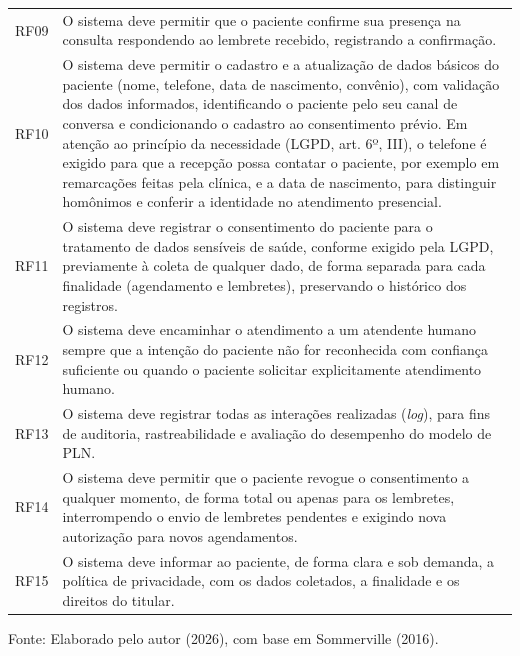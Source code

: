 \documentclass[12pt,a4paper]{extarticle}
\begin{document}
\begin{xltabular}{\textwidth}{p{1.4cm}Y}
RF09 & O sistema deve permitir que o paciente confirme sua presença na consulta respondendo ao lembrete recebido, registrando a confirmação. \\
RF10 & O sistema deve permitir o cadastro e a atualização de dados básicos do paciente (nome, telefone, data de nascimento, convênio), com validação dos dados informados, identificando o paciente pelo seu canal de conversa e condicionando o cadastro ao consentimento prévio. Em atenção ao princípio da necessidade (LGPD, art. 6º, III), o telefone é exigido para que a recepção possa contatar o paciente, por exemplo em remarcações feitas pela clínica, e a data de nascimento, para distinguir homônimos e conferir a identidade no atendimento presencial. \\
RF11 & O sistema deve registrar o consentimento do paciente para o tratamento de dados sensíveis de saúde, conforme exigido pela LGPD, previamente à coleta de qualquer dado, de forma separada para cada finalidade (agendamento e lembretes), preservando o histórico dos registros. \\
RF12 & O sistema deve encaminhar o atendimento a um atendente humano sempre que a intenção do paciente não for reconhecida com confiança suficiente ou quando o paciente solicitar explicitamente atendimento humano. \\
RF13 & O sistema deve registrar todas as interações realizadas (\textit{log}), para fins de auditoria, rastreabilidade e avaliação do desempenho do modelo de PLN. \\
RF14 & O sistema deve permitir que o paciente revogue o consentimento a qualquer momento, de forma total ou apenas para os lembretes, interrompendo o envio de lembretes pendentes e exigindo nova autorização para novos agendamentos. \\
RF15 & O sistema deve informar ao paciente, de forma clara e sob demanda, a política de privacidade, com os dados coletados, a finalidade e os direitos do titular. \\
\end{xltabular}
\vspace{0.3cm}

\footnotesize{Fonte: Elaborado pelo autor (2026), com base em Sommerville (2016).}
\end{document}
